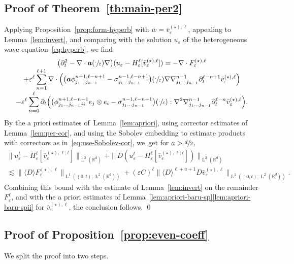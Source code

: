 \documentclass[JEP,XML,SOM,Unicode,published]{cedram}
\theoremstyle{plain}
\theoremstyle{definition}
\numberwithin{equation}{section}
\newcommand{\e}{\varepsilon}
\newcommand{\R}{\mathbb R}
\newcommand{\ee}{e}
\newcommand{\Aa}{\boldsymbol a}
\newcommand{\Ld}{\operatorname{L}}
\begin{document}
\subsection{Proof of Theorem~\ref{th:main-per2}}
Applying Proposition~\ref{prop:form-hyperb} with $\bar w=\bar v^{(\star),\ell}_\e$,
appealing to Lemma~\ref{lem:invert}, and comparing with the solution $u_\e$ of the heterogeneous wave equation~\eqref{eq:hyperb}, we find\vspace*{-3pt}
\begin{multline*}
\big(\partial_t^2-\nabla\cdot\Aa(\sfrac\cdot\e)\nabla\big)(u_\e-H^\ell_\e[\bar v_\e^{(\star),\ell}])=
- \nabla \cdot F_\e^{(\star),\ell}\\[-3pt]
+\e^{\ell}\sum_{n=1}^{\ell+1}\nabla\cdot\Big(\big(\Aa\phi_{j_1\ldots j_{n-1}}^{n-1,\ell-n+1}-\sigma^{n-1,\ell-n+1}_{j_1\ldots j_{n-1}}\big)(\sfrac\cdot\e)\nabla\nabla^{n-1}_{j_1\ldots j_{n-1}}\partial_t^{\ell-n+1}\bar v_\e^{(\star),\ell}\Big)\\[-3pt]
-\e^\ell\sum_{n=0}^{\ell}\partial_t \Big(\big(\phi^{n+1,\ell-n-1}_{j_1\ldots j_{n-1}ji}\ee_{j}\otimes\ee_{i}-\sigma^{n-1,\ell-n+1}_{j_1\ldots j_{n-1}}\big)(\sfrac\cdot\e):\nabla^2\nabla^{n-1}_{j_1\ldots j_{n-1}}\partial_t^{\ell-n}\bar v_\e^{(\star),\ell} \Big).
\end{multline*}
By the a priori estimates of~Lemma~\ref{lem:apriori}, using corrector estimates of Lemma~\ref{lem:per-cor}, and using the Sobolev embedding to estimate products with correctors as in~\eqref{eq:use-Sobolev-cor}, we~get for $a>\sfrac d2$,
\begin{multline*}
\|u_\e^t-H_\e^\ell[\bar v_\e^{(\star),\ell;t}]\|_{\Ld^2(\R^d)}+\|D(u_\e^t-H_\e^\ell[\bar v_\e^{(\star),\ell;t}])\|_{\Ld^2(\R^d)}\\
\lesssim\|\langle D\rangle F_\e^{(\star),\ell}\|_{\Ld^1((0,t);\Ld^2(\R^d))}+(\e C)^\ell\|\langle D\rangle^{\ell+a+1}D\bar v_\e^{(\star),\ell}\|_{\Ld^1((0,t);\Ld^2(\R^d))}.
\end{multline*}
Combining {this bound} with the estimate of Lemma~\ref{lem:invert} on the remainder $F_\e^\ell$, and with the a priori estimates of Lemma~\ref{lem:apriori-baru-sp}\eqref{lem:apriori-baru-spii} for $\bar v_\e^{(\star),\ell}$, the conclusion follows.
\qed

\subsection{Proof of Proposition~\ref{prop:even-coeff}}\label{sec:even-coeff}
We split the proof into two steps.
\end{document}
